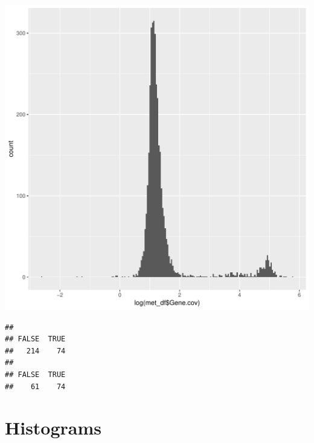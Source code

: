 \documentclass{article}\usepackage[]{graphicx}\usepackage[]{color}
\makeatletter
\def\maxwidth{ %
  \ifdim\Gin@nat@width>\linewidth
    \linewidth
  \else
    \Gin@nat@width
  \fi
}
\newenvironment{kframe}{%
 \def\at@end@of@kframe{}%
 \ifinner\ifhmode%
  \def\at@end@of@kframe{\end{minipage}}%
  \begin{minipage}{\columnwidth}%
 \fi\fi%
 \def\FrameCommand##1{\hskip\@totalleftmargin \hskip-\fboxsep
 \colorbox{shadecolor}{##1}\hskip-\fboxsep
     \hskip-\linewidth \hskip-\@totalleftmargin \hskip\columnwidth}%
 \MakeFramed {\advance\hsize-\width
   \@totalleftmargin\z@ \linewidth\hsize
   \@setminipage}}%
 {\par\unskip\endMakeFramed%
 \at@end@of@kframe}
\newenvironment{knitrout}{}{} %
\makeatother
\begin{document}
\begin{knitrout}
\includegraphics[width=\maxwidth]{figure/import_status_data-2} 
\begin{kframe}\begin{verbatim}
## 
## FALSE  TRUE 
##   214    74
## 
## FALSE  TRUE 
##    61    74
\end{verbatim}
\end{kframe}
\end{knitrout}

\section{Histograms}
\end{document}
